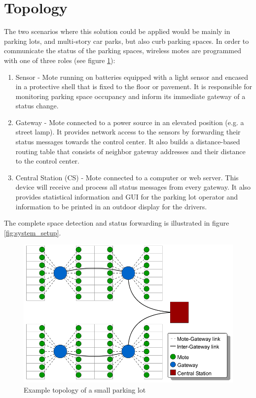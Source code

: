 \section{Topology}
The two scenarios where this solution could be applied would be mainly in parking lots, and multi-story car parks, but also curb parking spaces.
In order to communicate the status of the parking spaces, wireless motes are programmed with one of three roles (see figure \ref{fig:topology}):
\begin{enumerate}
	\item Sensor - Mote running on batteries equipped with a light sensor and encased in a protective shell that is fixed to the floor or pavement.
	It is responsible for monitoring parking space occupancy and inform its immediate gateway of a status change.
	\item Gateway - Mote connected to a power source in an elevated position (e.g. a street lamp). 
	It provides network access to the sensors by forwarding their status messages towards the control center. 
	It also builds a distance-based routing table that consists of neighbor gateway addresses and their distance to the control center.
	\item Central Station (CS) - Mote connected to a computer or web server. This device will receive and process all status messages from every gateway. 
	It also provides statistical information and GUI for the parking lot operator and information to be printed in an outdoor display for the drivers.
\end{enumerate}
The complete space detection and status forwarding is illustrated in figure \ref{fig:system_setup}.

\begin{figure}
    \centering
    \includegraphics[width=15cm]{images/General_ParkingLotTopology.png}
	\vspace{-1.5em}
    \caption{Example topology of a small parking lot}
    \vspace{-1.5em}
    \label{fig:topology}
\end{figure}

